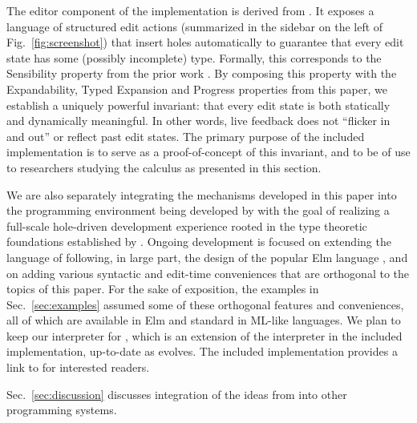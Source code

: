 The editor component of the implementation is derived from \Hazelnut. 
It exposes a language of structured edit actions (summarized in the sidebar on the left of Fig.~\ref{fig:screenshot}) that insert holes automatically to guarantee that every edit state has some (possibly incomplete) type. 
Formally,
this corresponds to the Sensibility property from the prior work \cite{popl-paper}. 
By composing this property with the Expandability, Typed Expansion and Progress properties from this paper, we establish a uniquely powerful 
invariant: that every edit state is both statically and dynamically meaningful. 
In other words, live feedback does not ``flicker in and out'' or reflect past edit states. 
The primary purpose of the included implementation is to serve as a proof-of-concept of this invariant, and to be of use to researchers studying the calculus as presented in this section.

We are also separately integrating the mechanisms developed in this paper into the \Hazel programming environment being developed by \citet{HazelnutSNAPL} with the goal of realizing a full-scale hole-driven development experience rooted in the type theoretic foundations established by \Hazelnut. 
Ongoing development is focused on extending the language of \Hazelnut following, in large part, the design of the popular Elm language \cite{Elm,czaplicki2012elm}, and on adding various syntactic and edit-time conveniences that are orthogonal to the topics of this paper. 
For the sake of exposition, the examples in Sec.~\ref{sec:examples} assumed some of these orthogonal features and conveniences, all of which are available in Elm and standard in ML-like languages.
We plan to keep our interpreter for \Hazel, which is an extension of the interpreter in the included implementation, up-to-date as \Hazel evolves.%
The included implementation provides a link to \Hazel for interested readers.

Sec.~\ref{sec:discussion} discusses integration of the ideas from \HazelnutLive into other programming systems.





